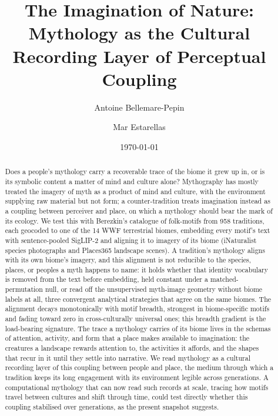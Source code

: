 \documentclass[11pt,a4paper]{article}
\title{\bfseries The Imagination of Nature:\\
\large Mythology as the Cultural Recording Layer of Perceptual Coupling}
\author[1]{Antoine Bellemare-Pepin}
\author[2]{Mar Estarellas}
\affil[1]{Department of Psychology, Université de Montréal}
\affil[2]{Department of Psychiatry, McGill University}
\date{\today}
\begin{document}
\maketitle

\begin{abstract}\noindent
Does a people's mythology carry a recoverable trace of the biome it
grew up in, or is its symbolic content a matter of mind and culture
alone? Mythography has mostly treated the imagery of myth as a
product of mind and culture, with the environment supplying raw
material but not form; a counter-tradition treats imagination
instead as a coupling between perceiver and place, on which a
mythology should bear the mark of its ecology. We test this with
Berezkin's catalogue of folk-motifs from 958 traditions, each
geocoded to one of the 14 WWF terrestrial biomes, embedding every
motif's text with sentence-pooled SigLIP-2 and aligning it to imagery
of its biome (iNaturalist species photographs and Places365 landscape
scenes). A tradition's mythology aligns with its own biome's imagery,
and this alignment is not reducible to the species, places, or
peoples a myth happens to name: it holds whether that identity
vocabulary is removed from the text before embedding, held constant
under a matched-permutation null, or read off the unsupervised
myth-image geometry without biome labels at all, three convergent
analytical strategies that agree on the same biomes. The alignment decays
monotonically with motif breadth, strongest in biome-specific motifs
and fading toward zero in cross-culturally universal ones; this
breadth gradient is the load-bearing signature. The trace a mythology
carries of its biome lives in the schemas of attention, activity, and
form that a place makes available to imagination: the creatures a
landscape rewards attention to, the activities it affords, and the
shapes that recur in it until they settle into narrative. We read
mythology as a cultural recording layer of this coupling between
people and place, the medium through which a tradition keeps its long
engagement with its environment legible across generations. A
computational mythology that can now read such records at scale,
tracing how motifs travel between cultures and shift through time,
could test directly whether this coupling stabilised over
generations, as the present snapshot suggests.
\end{abstract}

\vspace{0.6em}
\end{document}
